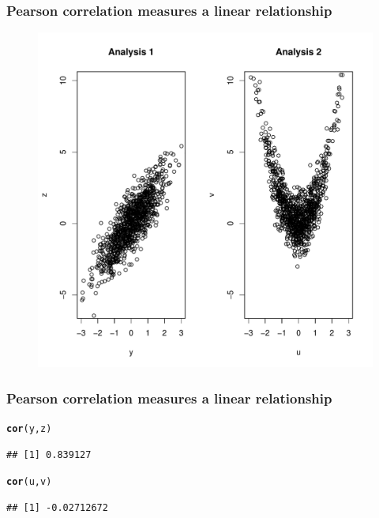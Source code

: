 \documentclass[compress]{beamer}\usepackage[]{graphicx}\usepackage[]{xcolor}
\makeatletter
\def\maxwidth{ %
  \ifdim\Gin@nat@width>\linewidth
    \linewidth
  \else
    \Gin@nat@width
  \fi
}
\newcommand{\hlstd}[1]{\textcolor[rgb]{0.345,0.345,0.345}{#1}}%
\newcommand{\hlkwd}[1]{\textcolor[rgb]{0.737,0.353,0.396}{\textbf{#1}}}%
\newenvironment{kframe}{%
 \def\at@end@of@kframe{}%
 \ifinner\ifhmode%
  \def\at@end@of@kframe{\end{minipage}}%
  \begin{minipage}{\columnwidth}%
 \fi\fi%
 \def\FrameCommand##1{\hskip\@totalleftmargin \hskip-\fboxsep
 \colorbox{shadecolor}{##1}\hskip-\fboxsep
     \hskip-\linewidth \hskip-\@totalleftmargin \hskip\columnwidth}%
 \MakeFramed {\advance\hsize-\width
   \@totalleftmargin\z@ \linewidth\hsize
   \@setminipage}}%
 {\par\unskip\endMakeFramed%
 \at@end@of@kframe}
\newenvironment{knitrout}{}{} %
\makeatother
\begin{document}
\begin{frame}[fragile]
  \frametitle{Pearson correlation measures a linear relationship}
    

    \begin{figure}[!htpb]
      \begin{center}
\begin{knitrout}
\color{fgcolor}
\includegraphics[width=\maxwidth]{figure/plot21-1} 
\end{knitrout}
      \end{center}
    \end{figure}
\end{frame}


\begin{frame}[fragile]
  \frametitle{Pearson correlation measures a linear relationship}
\begin{knitrout}
\color{fgcolor}\begin{kframe}
\begin{alltt}
  \hlkwd{cor}\hlstd{(y, z)}
\end{alltt}
\begin{verbatim}
## [1] 0.839127
\end{verbatim}
\begin{alltt}
  \hlkwd{cor}\hlstd{(u, v)}
\end{alltt}
\begin{verbatim}
## [1] -0.02712672
\end{verbatim}
\end{kframe}
\end{knitrout}
\end{frame}
\end{document}
